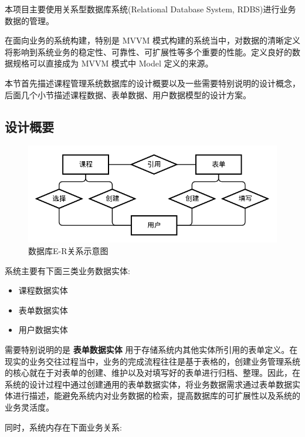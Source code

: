 本项目主要使用关系型数据库系统(Relational Database System, RDBS)进行业务数据的管理。

在面向业务的系统构建，特别是 MVVM 模式构建的系统当中，对数据的清晰定义将影响到系统业务的稳定性、可靠性、可扩展性等多个重要的性能。定义良好的数据规格可以直接成为 MVVM 模式中 Model 定义的来源。

本节首先描述课程管理系统数据库的设计概要以及一些需要特别说明的设计概念，后面几个小节描述课程数据、表单数据、用户数据模型的设计方案。

\newpage

\subsection{设计概要}

\begin{figure}[!h]
  \begin{center}
    \includegraphics[scale=0.5]{figures/diagram-er-overview.png}
    \caption{数据库E-R关系示意图\label{DatabaseOverview}}
  \end{center}
\end{figure}

系统主要有下面三类业务数据实体:

\begin{itemize}
  \item 课程数据实体
  \item 表单数据实体
  \item 用户数据实体
\end{itemize}

需要特别说明的是 \textbf{表单数据实体} 用于存储系统内其他实体所引用的表单定义。在现实的业务交往过程当中，业务的完成流程往往是基于表格的，创建业务管理系统的核心就在于对表单的创建、维护以及对填写好的表单进行归档、整理。因此，在系统的设计过程中通过创建通用的表单数据实体，将业务数据需求通过表单数据实体进行描述，能避免系统内对业务数据的检索，提高数据库的可扩展性以及系统的业务灵活度。

同时，系统内存在下面业务关系:

